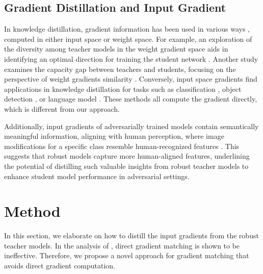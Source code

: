 \documentclass{article} %
\begin{document}
\subsection{Gradient Distillation and Input Gradient}
In knowledge distillation,  gradient information has been used in various ways \citep{czarnecki2017sobolev, du2020agree, zhu2021student, lan2023gradient,wang2022gradient}, computed in either input space or weight space.
For example, an exploration of the diversity among teacher models in the weight gradient space aids in identifying an optimal direction for training the student network \citep{du2020agree}.
Another study examines the capacity gap between teachers and students, focusing on the perspective of weight gradients similarity \citep{zhu2021student}.
Conversely, input space gradients find applications in knowledge distillation for tasks such as classification \citep{czarnecki2017sobolev}, object detection \citep{lan2023gradient}, or language model \citep{wang2022gradient}.
These methods all compute the gradient directly, which is different from our approach.

Additionally, input gradients of adversarially trained models contain semantically meaningful information, aligning with human perception, where image modifications for a specific class resemble human-recognized features \citep{tsipras2018robustness, engstrom2019adversarial, srinivas2023models}. This suggests that robust models capture more human-aligned features, underlining the potential of distilling such valuable insights from robust teacher models to enhance student model performance in adversarial settings.

\section{Method}
In this section, we elaborate on how to distill the input gradients from the robust teacher models. In the analysis of , direct gradient matching is shown to be ineffective. Therefore, we propose a novel approach for gradient matching that avoids direct gradient computation.
\end{document}
